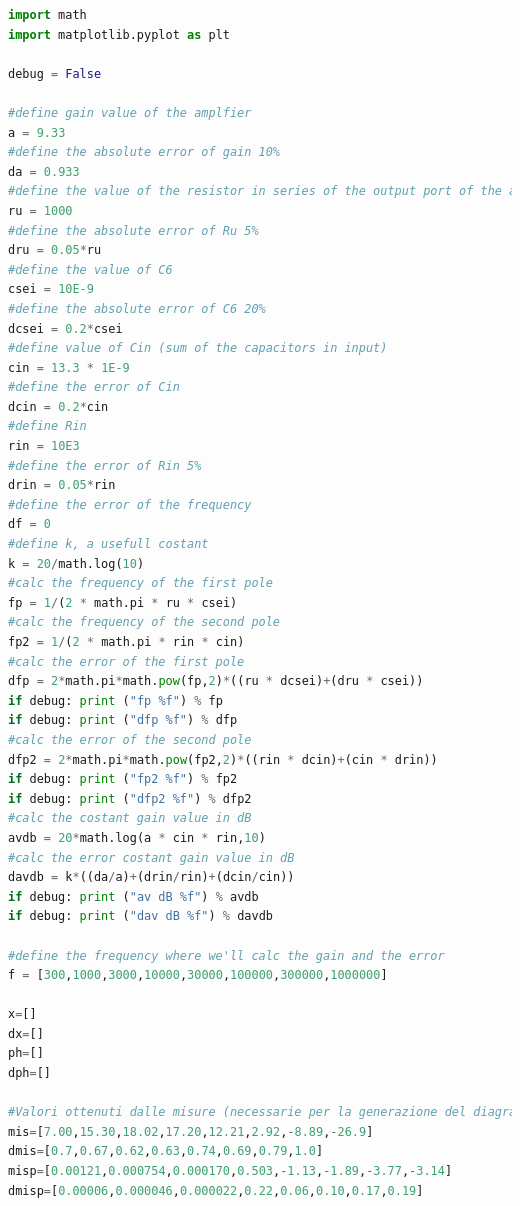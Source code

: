 \documentclass{article}
\begin{document}
\begin{lstlisting}[language=Python, breaklines=true]
import math
import matplotlib.pyplot as plt

debug = False

#define gain value of the amplfier
a = 9.33
#define the absolute error of gain 10%
da = 0.933
#define the value of the resistor in series of the output port of the amplifier
ru = 1000
#define the absolute error of Ru 5%
dru = 0.05*ru
#define the value of C6
csei = 10E-9
#define the absolute error of C6 20%
dcsei = 0.2*csei
#define value of Cin (sum of the capacitors in input)
cin = 13.3 * 1E-9
#define the error of Cin
dcin = 0.2*cin
#define Rin
rin = 10E3
#define the error of Rin 5%
drin = 0.05*rin
#define the error of the frequency
df = 0
#define k, a usefull costant
k = 20/math.log(10)
#calc the frequency of the first pole
fp = 1/(2 * math.pi * ru * csei)
#calc the frequency of the second pole
fp2 = 1/(2 * math.pi * rin * cin)
#calc the error of the first pole
dfp = 2*math.pi*math.pow(fp,2)*((ru * dcsei)+(dru * csei))
if debug: print ("fp %f") % fp
if debug: print ("dfp %f") % dfp
#calc the error of the second pole
dfp2 = 2*math.pi*math.pow(fp2,2)*((rin * dcin)+(cin * drin))
if debug: print ("fp2 %f") % fp2
if debug: print ("dfp2 %f") % dfp2
#calc the costant gain value in dB
avdb = 20*math.log(a * cin * rin,10)
#calc the error costant gain value in dB
davdb = k*((da/a)+(drin/rin)+(dcin/cin))
if debug: print ("av dB %f") % avdb
if debug: print ("dav dB %f") % davdb

#define the frequency where we'll calc the gain and the error
f = [300,1000,3000,10000,30000,100000,300000,1000000]

x=[]
dx=[]
ph=[]
dph=[]

#Valori ottenuti dalle misure (necessarie per la generazione del diagramma di bode)
mis=[7.00,15.30,18.02,17.20,12.21,2.92,-8.89,-26.9]
dmis=[0.7,0.67,0.62,0.63,0.74,0.69,0.79,1.0]
misp=[0.00121,0.000754,0.000170,0.503,-1.13,-1.89,-3.77,-3.14]
dmisp=[0.00006,0.000046,0.000022,0.22,0.06,0.10,0.17,0.19]


\end{lstlisting}
\end{document}
